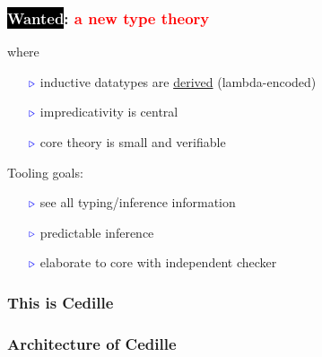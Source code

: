 \documentclass[11pt]{beamer}
\newcommand{\myb}[0]{\ensuremath{\textcolor{blue}{\triangleright}}}
\begin{document}
\begin{frame}
  \frametitle{\colorbox{black}{\textcolor{white}{Wanted}}: \textcolor{red}{a new type theory} }

  where

  \begin{itemize}
  \item[$\myb$] inductive datatypes are \underline{derived} (lambda-encoded)
  \item[$\myb$] impredicativity is central
  \item[$\myb$] core theory is small and verifiable
  \end{itemize}

\vspace{.15cm}

  Tooling goals:

  \begin{itemize}
  \item[$\myb$] see all typing/inference information 
  \item[$\myb$] predictable inference
  \item[$\myb$] elaborate to core with independent checker
  \end{itemize}

\end{frame}

\begin{frame}
  \frametitle{This is Cedille}

  \end{frame}

\begin{frame}
  \frametitle{Architecture of Cedille}

\hspace{1cm}

\end{frame}
\end{document}
